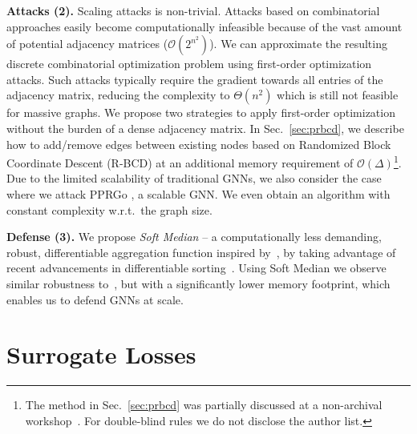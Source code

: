 \documentclass[sigconf, review]{acmart}
\begin{document}
\textbf{Attacks (2).} Scaling attacks is non-trivial. Attacks based on combinatorial approaches easily become computationally infeasible because of the vast amount of potential adjacency matrices (\(\mathcal{O}(2^{n^2})\)).
We can approximate the resulting discrete combinatorial optimization problem using first-order optimization attacks. Such attacks typically require the gradient towards all entries of the adjacency matrix, reducing the complexity to \(\Theta(n^2)\) which is still not feasible for massive graphs. We propose two strategies to apply first-order optimization without the burden of a dense adjacency matrix. In Sec.~\ref{sec:prbcd}, we describe how to add/remove edges between existing nodes based on Randomized Block Coordinate Descent (R-BCD) at an additional memory requirement of \(\mathcal{O}(\Delta)\)\footnote{The method in Sec.~\ref{sec:prbcd} was partially discussed at a non-archival workshop~\citep{Anonymous2021}. For double-blind rules we do not disclose the author list.}. Due to the limited scalability of traditional GNNs, we also consider the case where we attack PPRGo \cite{Bojchevski2020a}, a scalable GNN. We even obtain an algorithm with constant complexity w.r.t.\ the graph size.

\textbf{Defense (3).} We propose \emph{Soft Median} -- a computationally less demanding, robust, differentiable aggregation function inspired by~\citet{Geisler2020}, by taking advantage of recent advancements in differentiable sorting~\cite{Prillo2020}. Using Soft Median we observe similar robustness to~\citep{Geisler2020}, but with a significantly lower memory footprint, which enables us to defend GNNs at scale.

\section{Surrogate Losses}\label{sec:ceisbad} %
\end{document}
